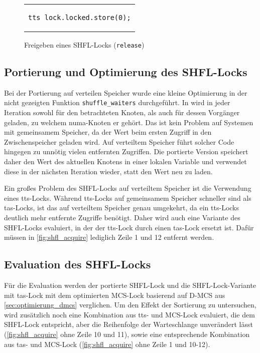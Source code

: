 \begin{figure}[h]
    \centering
    \begin{tabular}{c}\begin{lstlisting}
tts_lock.locked.store(0);
    \end{lstlisting}\end{tabular}
    \caption{Freigeben eines SHFL-Locks (\texttt{release})}
    \label{fig:shfl_release}
\end{figure}

\subsection{Portierung und Optimierung des SHFL-Locks}

Bei der Portierung auf verteilen Speicher
wurde eine kleine Optimierung
in der nicht gezeigten Funktion \texttt{shuffle\_waiters} durchgeführt.
In \cite{Shfl-Lock} wird in jeder Iteration
sowohl für den betrachteten Knoten,
als auch für dessen Vorgänger geladen,
zu welchem \gls{numa}-Knoten er gehört.
Das ist kein Problem auf Systemen mit gemeinsamem Speicher,
da der Wert beim ersten Zugriff in den \gls{Zwischenspeicher} geladen wird.
Auf verteiltem Speicher führt solcher Code hingegen zu unnötig vielen entfernten Zugriffen.
Die portierte Version speichert daher den Wert des aktuellen Knotens in einer lokalen Variable
und verwendet diese in der nächsten Iteration wieder,
statt den Wert neu zu laden.

Ein großes Problem des SHFL-Locks auf verteiltem Speicher
ist die Verwendung eines \gls{tts}-Locks.
Während \gls{tts}-Locks auf gemeinsamem Speicher schneller sind
als \gls{tas}-Locks,
ist das auf verteiltem Speicher genau umgekehrt,
da ein \gls{tts}-Locks deutlich mehr entfernte Zugriffe benötigt.
Daher wird auch eine Variante des SHFL-Locks evaluiert,
in der der \gls{tts}-Lock durch einen \gls{tas}-Lock ersetzt ist.
Dafür müssen in \autoref{fig:shfl_acquire} lediglich Zeile 1 und 12 entfernt werden.

\subsection{Evaluation des SHFL-Locks}

Für die Evaluation werden der portierte SHFL-Lock
und die SHFL-Lock-Variante mit \gls{tas}-Lock
mit dem optimierten MCS-Lock
basierend auf D-MCS aus \autoref{sec:optimierung_dmcs} verglichen.
Um den Effekt der Sortierung zu untersuchen,
wird zusätzlich noch eine Kombination aus \gls{tts}- und MCS-Lock evaluiert,
die dem SHFL-Lock entspricht,
aber die Reihenfolge der Warteschlange unverändert lässt
(\autoref{fig:shfl_acquire} ohne Zeile 10 und 11),
sowie eine entsprechende Kombination aus \gls{tas}- und MCS-Lock
(\autoref{fig:shfl_acquire} ohne Zeile 1 und 10-12).

